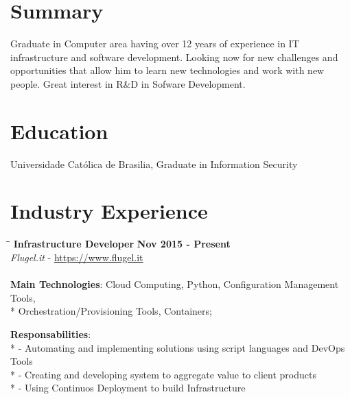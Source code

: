 \documentclass[margin]{res}
\begin{document}

\address{Pederneiras, SP, Brazil \\
  \href{mailto:brunocriado@gmail.com}{brunocriado@gmail.com} \\ Phone: 55 14 98136 8331}


\begin{resume}

  \section{Summary} Graduate in Computer area having over 12 years of
  experience in IT infrastructure and software development.
  Looking now for new challenges and opportunities that allow him to learn new
  technologies and work with new people. 
  Great interest in R\&D in Sofware Development.

  \section{Education} Universidade Católica de Brasilia, Graduate in Information
  Security
  

\section{Industry Experience}

\vspace{-0.1in}
\begin{tabbing}
  \hspace{2.3in}\= \hspace{1.7in}\= \kill %
  \textbf{Infrastructure Developer}    \>\>\textbf{Nov 2015 - Present}\\
  \textit{Flugel.it} - \url{https://www.flugel.it}\\\\
  \textbf{Main Technologies}: Cloud Computing, Python, Configuration Management Tools,\\*
  Orchestration/Provisioning Tools, Containers;
\end{tabbing}\vspace{-20pt}      %
\vspace{2mm}\textbf{Responsabilities}: \\*
  - Automating and implementing solutions using script languages and DevOps Tools \\*
  - Creating and developing system to aggregate value to client products \\*
  - Using Continuos Deployment to build Infrastructure\\


\end{resume}
\end{document}
